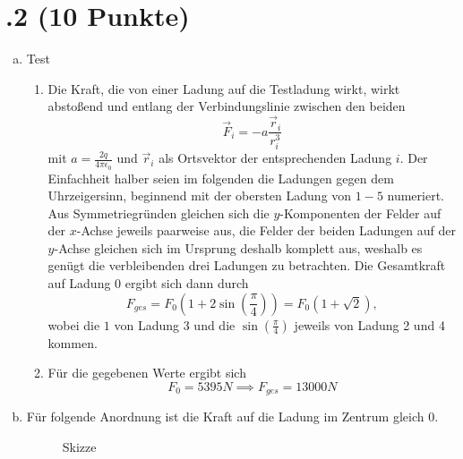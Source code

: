 \section*{\nr.2 \tittwo (10 Punkte)}
\begin{enumerate}[(a)]
\item Test
\begin{enumerate}[(1)]
\item Die Kraft, die von einer Ladung auf die Testladung wirkt, wirkt abstoßend und entlang der Verbindungslinie zwischen den beiden
\begin{equation}
  \vec F_i=-a \frac{\vec r_i}{r_i^3}
\end{equation}
mit $a=\frac{2q}{4\pi\epsilon_0}$ und $\vec r_i$ als Ortsvektor der entsprechenden Ladung $i$. Der Einfachheit halber seien im folgenden die Ladungen gegen dem Uhrzeigersinn, beginnend mit der obersten Ladung von $1-5$ numeriert.
Aus Symmetriegründen gleichen sich die $y$-Komponenten der Felder auf der $x$-Achse jeweils paarweise aus, die Felder der beiden Ladungen auf der $y$-Achse gleichen sich im Ursprung deshalb komplett aus, weshalb es genügt die verbleibenden drei Ladungen zu betrachten. 
Die Gesamtkraft auf Ladung 0 ergibt sich dann durch
\begin{equation}
  F_{ges}=F_0\left(1+2\sin\left(\frac{\pi}{4}\right)\right) = F_0\left(1+\sqrt{2}\right),
\end{equation}
wobei die $1$ von Ladung 3 und die $\sin\left(\frac{\pi}{4}\right)$ jeweils von Ladung 2 und 4 kommen.
\item Für die gegebenen Werte ergibt sich 
\begin{equation}
  F_0=5395N \implies F_{ges}=13000N
\end{equation}
\end{enumerate}
\item Für folgende Anordnung ist die Kraft auf die Ladung im Zentrum gleich 0.

\begin{figure}[H]
\centering
{}

\caption{Skizze}
\label{fig:s1}
\end{figure}



\end{enumerate}